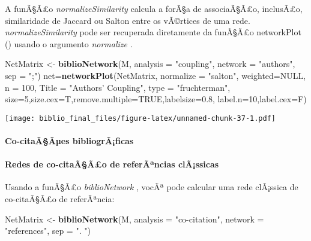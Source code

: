\documentclass[]{article}
\newenvironment{Shaded}{\begin{snugshade}}{\end{snugshade}}
\newcommand{\KeywordTok}[1]{\textcolor[rgb]{0.13,0.29,0.53}{\textbf{#1}}}
\newcommand{\DataTypeTok}[1]{\textcolor[rgb]{0.13,0.29,0.53}{#1}}
\newcommand{\DecValTok}[1]{\textcolor[rgb]{0.00,0.00,0.81}{#1}}
\newcommand{\FloatTok}[1]{\textcolor[rgb]{0.00,0.00,0.81}{#1}}
\newcommand{\StringTok}[1]{\textcolor[rgb]{0.31,0.60,0.02}{#1}}
\newcommand{\OtherTok}[1]{\textcolor[rgb]{0.56,0.35,0.01}{#1}}
\newcommand{\NormalTok}[1]{#1}
\let\oldparagraph\paragraph
\renewcommand{\paragraph}[1]{\oldparagraph{#1}\mbox{}}
\begin{document}
A funÃ§Ã£o \emph{normalizeSimilarity} calcula a forÃ§a de associaÃ§Ã£o,
inclusÃ£o, similaridade de Jaccard ou Salton entre os vÃ©rtices de uma
rede. \emph{normalizeSimilarity} pode ser recuperada diretamente da
funÃ§Ã£o networkPlot () usando o argumento \emph{normalize} .

\begin{Shaded}
\begin{Highlighting}[]
\NormalTok{NetMatrix <-}\StringTok{ }\KeywordTok{biblioNetwork}\NormalTok{(M, }\DataTypeTok{analysis =} \StringTok{"coupling"}\NormalTok{, }
                           \DataTypeTok{network =} \StringTok{"authors"}\NormalTok{, }\DataTypeTok{sep =} \StringTok{";"}\NormalTok{)}
\NormalTok{net=}\KeywordTok{networkPlot}\NormalTok{(NetMatrix,  }\DataTypeTok{normalize =} \StringTok{"salton"}\NormalTok{, }\DataTypeTok{weighted=}\OtherTok{NULL}\NormalTok{, }
                \DataTypeTok{n =} \DecValTok{100}\NormalTok{, }\DataTypeTok{Title =} \StringTok{"Authors' Coupling"}\NormalTok{, }\DataTypeTok{type =} \StringTok{"fruchterman"}\NormalTok{,}
                \DataTypeTok{size=}\DecValTok{5}\NormalTok{,}\DataTypeTok{size.cex=}\NormalTok{T,}\DataTypeTok{remove.multiple=}\OtherTok{TRUE}\NormalTok{,}\DataTypeTok{labelsize=}\FloatTok{0.8}\NormalTok{, }
                \DataTypeTok{label.n=}\DecValTok{10}\NormalTok{,}\DataTypeTok{label.cex=}\NormalTok{F)}
\end{Highlighting}
\end{Shaded}

\texttt{[image: biblio\_final\_files/figure-latex/unnamed-chunk-37-1.pdf]}

\paragraph{Co-citaÃ§Ãµes
bibliogrÃ¡ficas}\label{co-citaaaes-bibliograficas}

\paragraph{Redes de co-citaÃ§Ã£o de referÃªncias
clÃ¡ssicas}\label{redes-de-co-citaaao-de-referancias-classicas}

Usando a funÃ§Ã£o \emph{biblioNetwork} , vocÃª pode calcular uma rede
clÃ¡ssica de co-citaÃ§Ã£o de referÃªncia:

\begin{Shaded}
\begin{Highlighting}[]
\NormalTok{NetMatrix <-}\StringTok{ }\KeywordTok{biblioNetwork}\NormalTok{(M, }\DataTypeTok{analysis =} \StringTok{"co-citation"}\NormalTok{, }
                           \DataTypeTok{network =} \StringTok{"references"}\NormalTok{, }\DataTypeTok{sep =} \StringTok{".  "}\NormalTok{)}
\end{Highlighting}
\end{Shaded}
\end{document}
